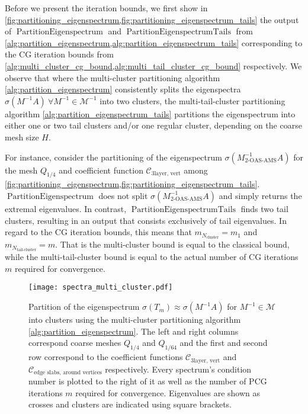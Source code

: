 Before we present the iteration bounds, we first show in \cref{fig:partitioning_eigenspectrum,fig:partitioning_eigenspectrum_tails} the output of $\operatorname{PartitionEigenspectrum}$ and $\operatorname{PartitionEigenspectrumTails}$ from \cref{alg:partition_eigenspectrum,alg:partition_eigenspectrum_tails} corresponding to the CG iteration bounds from \cref{alg:multi_cluster_cg_bound,alg:multi_tail_cluster_cg_bound} respectively. We observe that where the multi-cluster partitioning algorithm \cref{alg:partition_eigenspectrum} consistently splits the eigenspectra $\sigma(M^{-1}A) \ \forall M^{-1} \in\mathcal{M}^{-1}$ into two clusters, the multi-tail-cluster partitioning algorithm \cref{alg:partition_eigenspectrum_tails} partitions the eigenspectrum into either one or two tail clusters and/or one regular cluster, depending on the coarse mesh size $H$. 

For instance, consider the partitioning of the eigenspectrum $\sigma(M_{\text{2-OAS-AMS}}^{-1}A)$ for the mesh $Q_{1/4}$ and coefficient function $\mathcal{C}_{\text{3layer, vert}}$ among \cref{fig:partitioning_eigenspectrum,fig:partitioning_eigenspectrum_tails}. $\operatorname{PartitionEigenspectrum}$ does not split $\sigma(M_{\text{2-OAS-AMS}}^{-1}A)$ and simply returns the extremal eigenvalues. In contrast, $\operatorname{PartitionEigenspectrumTails}$ finds two tail clusters, resulting in an output that consists exclusively of tail eigenvalues. In regard to the CG iteration bounds, this means that $m_{N_{\text{cluster}}} = m_1$ and $m_{N_{\text{tail-cluster}}} = m$. That is the multi-cluster bound is equal to the classical bound, while the multi-tail-cluster bound is equal to the actual number of CG iterations $m$ required for convergence.
\begin{figure}[H]
    \centering
    \texttt{[image: spectra\_multi\_cluster.pdf]}
    \caption{Partition of the eigenspectrum $\sigma(T_m)\approx\sigma(M^{-1}A)$ for $M^{-1}\in\mathcal{M}$ into clusters using the multi-cluster partitioning algorithm \cref{alg:partition_eigenspectrum}. The left and right columns correspond coarse meshes $Q_{1/4}$ and $Q_{1/64}$ and the first and second row correspond to the coefficient functions $\mathcal{C}_{\text{3layer, vert}}$ and $\mathcal{C}_{\text{edge slabs, around vertices}}$ respectively. Every spectrum's condition number is plotted to the right of it as well as the number of PCG iterations $m$ required for convergence. Eigenvalues are shown as crosses and clusters are indicated using square brackets.}
    \label{fig:partitioning_eigenspectrum}
\end{figure}

